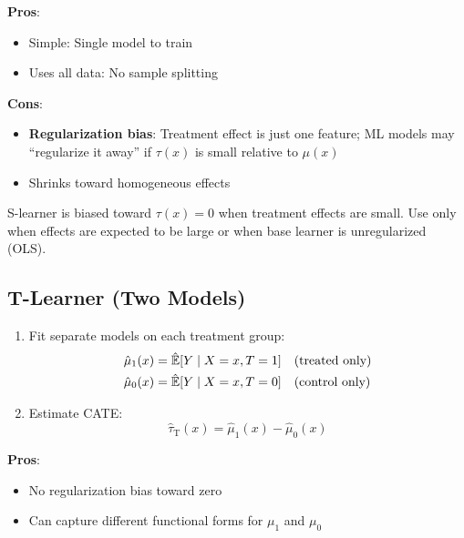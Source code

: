 \textbf{Pros}:
\begin{itemize}
    \item Simple: Single model to train
    \item Uses all data: No sample splitting
\end{itemize}

\textbf{Cons}:
\begin{itemize}
    \item \textbf{Regularization bias}: Treatment effect is just one feature; ML models may ``regularize it away'' if $\tau(x)$ is small relative to $\mu(x)$
    \item Shrinks toward homogeneous effects
\end{itemize}

\begin{insight}
S-learner is biased toward $\tau(x) = 0$ when treatment effects are small. Use only when effects are expected to be large or when base learner is unregularized (OLS).
\end{insight}

\subsection{T-Learner (Two Models)}

\begin{definition}[T-Learner]
\begin{enumerate}
    \item Fit separate models on each treatment group:
    \begin{align}
    \hat{\mu}_1(x) &= \hat{\mathbb{E}}[Y \mid X=x, T=1] \quad \text{(treated only)} \\
    \hat{\mu}_0(x) &= \hat{\mathbb{E}}[Y \mid X=x, T=0] \quad \text{(control only)}
    \end{align}
    \item Estimate CATE:
    \begin{equation}
    \hat{\tau}_{\text{T}}(x) = \hat{\mu}_1(x) - \hat{\mu}_0(x)
    \end{equation}
\end{enumerate}
\end{definition}

\textbf{Pros}:
\begin{itemize}
    \item No regularization bias toward zero
    \item Can capture different functional forms for $\mu_1$ and $\mu_0$
\end{itemize}

